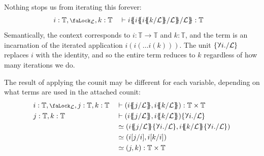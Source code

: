 \documentclass[10pt]{article}
\theoremstyle{definition}
\let\oldequiv\equiv%
\renewcommand{\equiv}{\simeq}
\newcommand{\defeq}{\oldequiv}
\newcommand{\yields}{\vdash}
\newcommand{\lock}{\mathchoice {\scalebox{0.8}{\text{\faLock}}}
  {\scalebox{0.8}{\text{\faLock}}} {\scalebox{0.5}{\text{\faLock}}}
  {\scalebox{0.4}{\text{\faLock}}} }
\newcommand{\rbindsym}{%
  \mathchoice
    {\reflectbox{\rotatebox[origin=c]{185}{$\lambda$}}}  %
    {\reflectbox{\rotatebox[origin=c]{185}{$\lambda$}}}  %
    {\reflectbox{\rotatebox[origin=c]{185}{$\scriptstyle\lambda$}}}  %
    {\reflectbox{\rotatebox[origin=c]{185}{$\scriptscriptstyle\lambda$}}}  %
  }
\newcommand{\Tiny}{\mathbb{T}}
\newcommand{\lockn}[1]{\mathcal{#1}}
\newcommand{\ctxlocke}[1]{\lock_{#1}}
\newcommand{\ctxlock}[1]{\ctxlocke{\lockn{#1}}}
\newcommand{\stubra}[1]{\{\!\!\{ #1 \}\!\!\}}
\newcommand{\admbra}[1]{\{\mkern-1mu #1 \mkern-0.5mu\}}
\newcommand{\substuck}[2]{\stubra{#1/\lockn{#2}}}
\newcommand{\sublock}[2]{\admbra{\rbindsym{} #1. /\lockn{#2} }}
\begin{document}
Nothing stops us from iterating this forever:
\begin{alignat*}{2}
  &i : \Tiny, \ctxlock{L}, k : \Tiny
  &&\yields
     i\substuck{i\substuck{i\substuck{k}{L}}{L}}{L} : \Tiny
\end{alignat*}
Semantically, the context corresponds to $i : \Tiny \to \Tiny$ and
$k : \Tiny$, and the term is an incarnation of the iterated
application $i(i(\dots i(k)))$. The unit $\sublock{i}{L}$ replaces $i$
with the identity, and so the entire term reduces to $k$ regardless of
how many iterations we do.

The result of applying the counit may be different for each variable,
depending on what terms are used in the attached counit:
\begin{alignat*}{2}
  &i : \Tiny,\ctxlock{L}, j : \Tiny, k : \Tiny
  &&\yields (i\substuck{j}{L}, i\substuck{k}{L}) : \Tiny \times \Tiny \\
  &j : \Tiny, k : \Tiny
  &&\yields (i\substuck{j}{L}, i\substuck{k}{L})\sublock{i}{L} \\
  &&&\defeq (i\substuck{j}{L}\sublock{i}{L}, i\substuck{k}{L}\sublock{i}{L}) \\
  &&&\defeq (i[j/i], i[k/i]) \\
  &&&\defeq (j, k) : \Tiny \times \Tiny
\end{alignat*}
\end{document}
